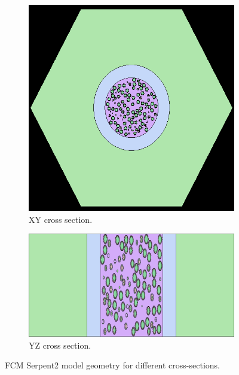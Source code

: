 \documentclass[11pt,letterpaper]{article}
\begin{document}
	\begin{figure}[H]
		\centering
		\begin{subfigure}[t]{0.4\textwidth}
			\centering
			\includegraphics[width=\linewidth]{figures/FCM_geom1.png} 
			\caption{XY cross section.}
			\label{fig:FCM_xy}
		\end{subfigure}
		\begin{subfigure}[t]{0.4\textwidth}
			\centering
			\includegraphics[width=\linewidth]{figures/FCM_geom2.png}
			\caption{YZ cross section.}
			\label{fig:FCM_yz}
		\end{subfigure}
		\hfill
		\caption{FCM Serpent2 model geometry for different cross-sections.}
		\label{fig:FCM}
	\end{figure}
\end{document}
